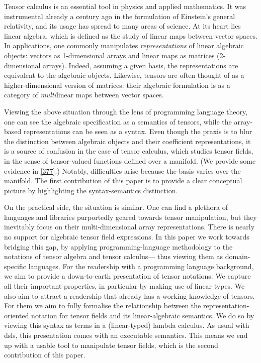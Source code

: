 \documentclass[nolinenum]{jfp}
\begin{document}
Tensor calculus is an essential tool in physics and applied
mathematics.  It was instrumental already a century ago in the
formulation of Einstein's general relativity, and its usage has spread
to many areas of science. At its heart lies linear algebra, which is
defined as the study of linear maps between vector spaces. In
applications, one commonly manipulates \emph{representations} of
linear algebraic objects: vectors as 1-dimensional arrays and linear
maps as matrices (2-dimensional arrays). Indeed, assuming a given
basis, the representations are equivalent to the algebraic objects.
Likewise, tensors are often thought of as a higher-dimensional
version of matrices: their algebraic formulation is as a
category of \emph{multi}linear maps between vector spaces.

Viewing the above situation through the lens of programming language
theory, one can see the algebraic specification as a semantics of tensors,
while the array-based representations can be seen as a syntax.  Even
though the praxis is to blur the distinction between algebraic objects
and their coefficient representations, it is a source of confusion in
the case of tensor calculus, which studies tensor fields, in the sense
of tensor-valued functions defined over a manifold. (We provide some
evidence in \cref{377}.) Notably, difficulties arise because the basis
varies over the manifold.  The first contribution of this paper is to provide a
clear conceptual picture by highlighting the syntax-semantics
distinction.

On the practical side, the situation is similar. One can find a
plethora of languages and libraries purportedly geared towards tensor
manipulation, but they inevitably focus on their multi-dimensional
array representations. There is nearly no support for algebraic tensor
field expressions.  In this paper we work towards bridging this gap,
by applying programming-language methodology to the notations of
tensor algebra and tensor calculus--- thus viewing them as
domain-specific languages.
 For the readership with a programming language background, we aim to
provide a down-to-earth presentation of tensor notations.  We capture
all their important properties, in particular by making use of linear
types.  We also aim to attract a readership that already has a working
knowledge of tensors. For them we aim to fully formalise the
relationship between the representation-oriented notation for tensor
fields and its linear-algebraic semantics. We do so by viewing this
syntax as terms in a (linear-typed) lambda calculus.  As usual with
{\sc{}dsl}s, this presentation comes with an executable semantics. This
means we end up with a usable tool to manipulate tensor fields, which is the second contribution of this paper.
\end{document}
